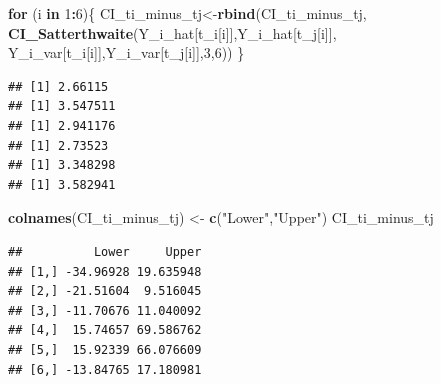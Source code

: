 \documentclass[12pt,]{article}
\newenvironment{Shaded}{\begin{snugshade}}{\end{snugshade}}
\newcommand{\KeywordTok}[1]{\textcolor[rgb]{0.13,0.29,0.53}{\textbf{#1}}}
\newcommand{\DecValTok}[1]{\textcolor[rgb]{0.00,0.00,0.81}{#1}}
\newcommand{\StringTok}[1]{\textcolor[rgb]{0.31,0.60,0.02}{#1}}
\newcommand{\ControlFlowTok}[1]{\textcolor[rgb]{0.13,0.29,0.53}{\textbf{#1}}}
\newcommand{\OperatorTok}[1]{\textcolor[rgb]{0.81,0.36,0.00}{\textbf{#1}}}
\newcommand{\NormalTok}[1]{#1}
\begin{document}
\begin{Shaded}
\begin{Highlighting}[]
\ControlFlowTok{for}\NormalTok{ (i }\ControlFlowTok{in} \DecValTok{1}\OperatorTok{:}\DecValTok{6}\NormalTok{)\{}
\NormalTok{CI_ti_minus_tj<-}\KeywordTok{rbind}\NormalTok{(CI_ti_minus_tj,}
\KeywordTok{CI_Satterthwaite}\NormalTok{(Y_i_hat[t_i[i]],Y_i_hat[t_j[i]],}
\NormalTok{                 Y_i_var[t_i[i]],Y_i_var[t_j[i]],}\DecValTok{3}\NormalTok{,}\DecValTok{6}\NormalTok{)) \}}
\end{Highlighting}
\end{Shaded}

\begin{verbatim}
## [1] 2.66115
## [1] 3.547511
## [1] 2.941176
## [1] 2.73523
## [1] 3.348298
## [1] 3.582941
\end{verbatim}

\begin{Shaded}
\begin{Highlighting}[]
\KeywordTok{colnames}\NormalTok{(CI_ti_minus_tj) <-}\StringTok{ }\KeywordTok{c}\NormalTok{(}\StringTok{"Lower"}\NormalTok{,}\StringTok{"Upper"}\NormalTok{)}
\NormalTok{CI_ti_minus_tj}
\end{Highlighting}
\end{Shaded}

\begin{verbatim}
##          Lower     Upper
## [1,] -34.96928 19.635948
## [2,] -21.51604  9.516045
## [3,] -11.70676 11.040092
## [4,]  15.74657 69.586762
## [5,]  15.92339 66.076609
## [6,] -13.84765 17.180981
\end{verbatim}
\end{document}

